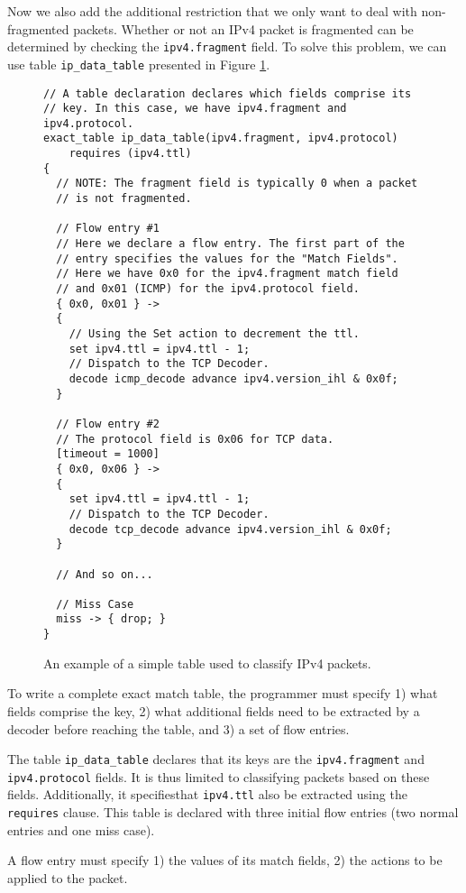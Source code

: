 Now we also add the additional restriction that we only want to deal with non-fragmented packets. Whether or not an IPv4 packet is fragmented can be determined by checking the \texttt{ipv4.fragment} field. To solve this problem, we can use table \texttt{ip\_data\_table} presented in Figure \ref{fg:ip_table_ex}.

\begin{figure}
\begin{lstlisting}
// A table declaration declares which fields comprise its
// key. In this case, we have ipv4.fragment and ipv4.protocol.
exact_table ip_data_table(ipv4.fragment, ipv4.protocol)
	requires (ipv4.ttl)
{
  // NOTE: The fragment field is typically 0 when a packet
  // is not fragmented.
  
  // Flow entry #1 
  // Here we declare a flow entry. The first part of the
  // entry specifies the values for the "Match Fields".
  // Here we have 0x0 for the ipv4.fragment match field
  // and 0x01 (ICMP) for the ipv4.protocol field.
  { 0x0, 0x01 } ->
  {
    // Using the Set action to decrement the ttl.
  	set ipv4.ttl = ipv4.ttl - 1;
  	// Dispatch to the TCP Decoder.
  	decode icmp_decode advance ipv4.version_ihl & 0x0f;
  } 
  
  // Flow entry #2
  // The protocol field is 0x06 for TCP data.
  [timeout = 1000]
  { 0x0, 0x06 } ->
  {
  	set ipv4.ttl = ipv4.ttl - 1;
  	// Dispatch to the TCP Decoder.
  	decode tcp_decode advance ipv4.version_ihl & 0x0f;
  } 
    
  // And so on...
  
  // Miss Case
  miss -> { drop; }
}
\end{lstlisting}
\caption{An example of a simple table used to classify IPv4 packets.}
\label{fg:ip_table_ex}
\end{figure}

To write a complete exact match table, the programmer must specify 1) what fields comprise the key, 2) what additional fields need to be extracted by a decoder before reaching the table, and 3) a set of flow entries. 

The table \texttt{ip\_data\_table} declares that its keys are the \texttt{ipv4.fragment} and \texttt{ipv4.protocol} fields. It is thus limited to classifying packets based on these fields. Additionally, it specifiesthat \texttt{ipv4.ttl} also be extracted using the \texttt{\color{blue}requires} clause. This table is declared with three initial flow entries (two normal entries and one miss case).

A flow entry must specify 1) the values of its match fields, 2) the actions to be applied to the packet.


